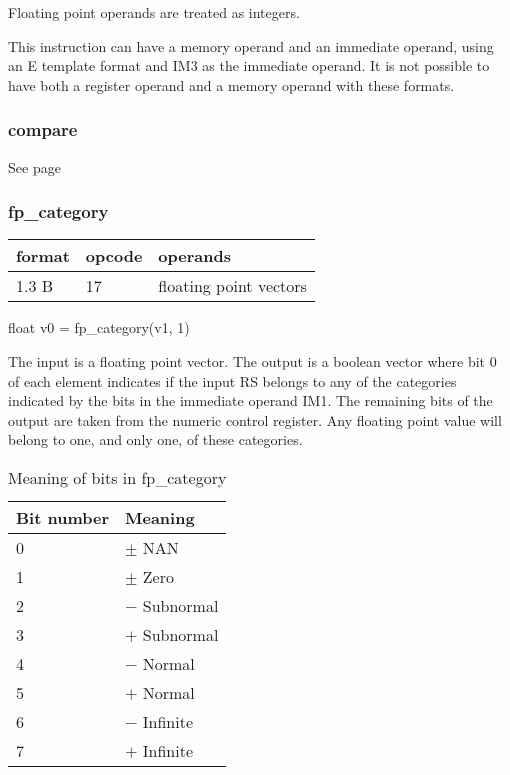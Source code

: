 \documentclass[forwardcom.tex]{subfiles}
\begin{document}
\vspace{2mm}
Floating point operands are treated as integers.

\vspace{2mm}
This instruction can have a memory operand and an immediate operand, using an E template format and IM3  as the immediate operand. It is not possible to have both a register operand and a memory operand with these formats.
\vspace{2mm}

\subsubsection{compare}
See page \pageref{table:compareInstruction}
\vspace{2mm}

\subsubsection{fp\_category}
\label{table:fpCategoryInstruction}
\begin{tabular}{|p{12mm}|p{12mm}|p{110mm}|}
\hline
\bfseries format & \bfseries opcode & \bfseries operands \\ \hline
1.3 B & 17 & floating point vectors \\ \hline
\end{tabular}
\vspace{2mm}

float v0 = fp\_category(v1, 1)
\vspace{2mm}

The input is a floating point vector. The output is a boolean vector where bit 0 of each element indicates if the input RS belongs to any of the categories indicated by the bits in the immediate operand IM1. The remaining bits of the output are taken from the numeric control register. 
Any floating point value will belong to one, and only one, of these categories. 

\begin{longtable} {|p{20mm}|p{90mm}|}
\caption{Meaning of bits in fp\_category} 
\label{table:fpCategoryInstructionBits} \\
\endfirsthead
\endhead
\hline
\bfseries Bit number & \bfseries Meaning  \\
\hline
0 & $\pm$ NAN \\
1 & $\pm$ Zero \\
2 & $-$ Subnormal \\
3 & $+$ Subnormal \\
4 & $-$ Normal \\
5 & $+$ Normal \\
6 & $-$ Infinite  \\
7 & $+$ Infinite  \\
\hline
\end{longtable}
\end{document}

